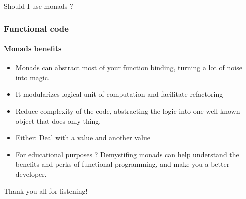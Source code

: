 \begin{frame}
    \centering
    \Huge Should I use monads ?
\end{frame}

\begin{frame}
    \frametitle{Functional code}
    \framesubtitle{Monads benefits}

    \begin{itemize}
        \item Monads can abstract most of your function binding, turning a lot of
            noise into magic.
        \item It modularizes logical unit of computation and facilitate refactoring
        \item Reduce complexity of the code, abstracting the logic into one well
            known object that does only thing.
        \item Either: Deal with a value and another value
        \item For educational purposes ? Demystifing monads can help understand
            the benefits and perks of functional programming, and make you a better
            developer.
    \end{itemize}
\end{frame}

\begin{frame}
    \centering
    \Huge Thank you all for listening!
\end{frame}
